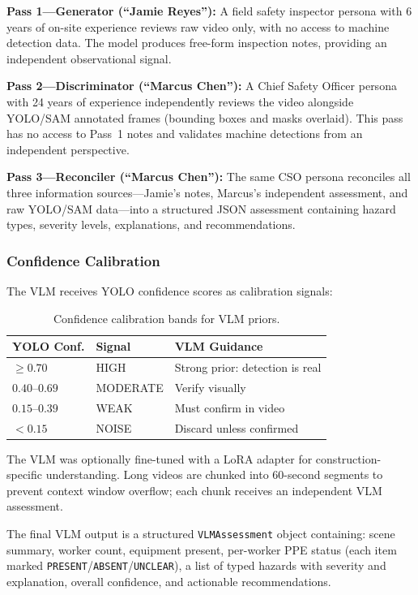 \documentclass[11pt, twocolumn]{article}
\begin{document}
\textbf{Pass 1---Generator (``Jamie Reyes''):} A field safety inspector persona with 6 years of on-site experience reviews raw video only, with no access to machine detection data. The model produces free-form inspection notes, providing an independent observational signal.

\textbf{Pass 2---Discriminator (``Marcus Chen''):} A Chief Safety Officer persona with 24 years of experience independently reviews the video alongside YOLO/SAM annotated frames (bounding boxes and masks overlaid). This pass has no access to Pass~1 notes and validates machine detections from an independent perspective.

\textbf{Pass 3---Reconciler (``Marcus Chen''):} The same CSO persona reconciles all three information sources---Jamie's notes, Marcus's independent assessment, and raw YOLO/SAM data---into a structured JSON assessment containing hazard types, severity levels, explanations, and recommendations.

\subsubsection{Confidence Calibration}

The VLM receives YOLO confidence scores as calibration signals:

\begin{table}[H]
\centering
\small
\caption{Confidence calibration bands for VLM priors.}
\begin{tabular}{lll}
\toprule
\textbf{YOLO Conf.} & \textbf{Signal} & \textbf{VLM Guidance} \\
\midrule
$\geq 0.70$ & HIGH & Strong prior: detection is real \\
$0.40$--$0.69$ & MODERATE & Verify visually \\
$0.15$--$0.39$ & WEAK & Must confirm in video \\
$< 0.15$ & NOISE & Discard unless confirmed \\
\bottomrule
\end{tabular}
\end{table}

The VLM was optionally fine-tuned with a LoRA adapter for construction-specific understanding. Long videos are chunked into 60-second segments to prevent context window overflow; each chunk receives an independent VLM assessment.

The final VLM output is a structured \texttt{VLMAssessment} object containing: scene summary, worker count, equipment present, per-worker PPE status (each item marked \texttt{PRESENT}/\texttt{ABSENT}/\texttt{UNCLEAR}), a list of typed hazards with severity and explanation, overall confidence, and actionable recommendations.
\end{document}
